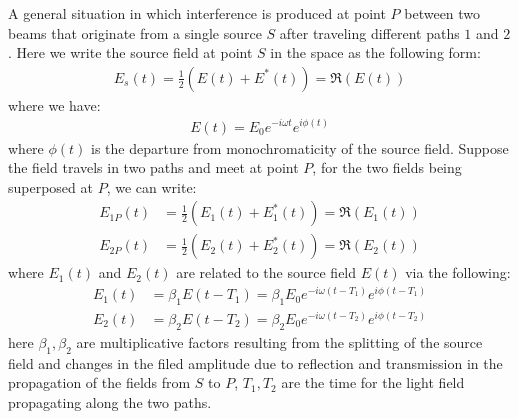 \documentclass[11pt]{book}
\theoremstyle{break}
\theoremstyle{break}
\begin{document}
A general situation in
which interference is produced at point $P$ between two beams that originate from a single source $S$ after traveling different paths $1$ and $2$. Here we write the source field at point $S$ in the space as the following form:
\begin{align*}
E_s(t) =\frac{1}{2}(E(t) + E^*(t)) = \Re(E(t))
\end{align*}
where we have:
\begin{align*}
E(t) = E_0 e^{-i\omega t}e^{i\phi(t)}
\end{align*}
where $\phi(t)$ is the departure from monochromaticity of the source field. Suppose the field travels in two paths and meet at point $P$, for the two fields being superposed at $P$, we can write:
\begin{align*}
E_{1P}(t) &= \frac{1}{2}(E_1(t) + E_1^*(t)) = \Re(E_1(t)) \\
E_{2P}(t) &= \frac{1}{2}(E_2(t) + E_2^*(t)) = \Re(E_2(t))
\end{align*} 
where $E_1(t)$ and $E_2(t)$ are related to the source field $E(t)$ via the following:
\begin{align*}
E_1(t) &= \beta_1E(t-T_1) = \beta_1 E_0 e^{-i\omega(t-T_1)}e^{i\phi(t-T_1)}\\
E_2(t) &= \beta_2E(t-T_2) = \beta_2 E_0 e^{-i\omega(t-T_2)}e^{i\phi(t-T_2)}
\end{align*}
here $\beta_1,\beta_2$ are multiplicative factors resulting from the splitting of the source field and changes in the filed amplitude due to reflection and transmission in the propagation of the fields from $S$ to $P$, $T_1,T_2$ are the time for the light field propagating along the two paths.\\
\end{document}
